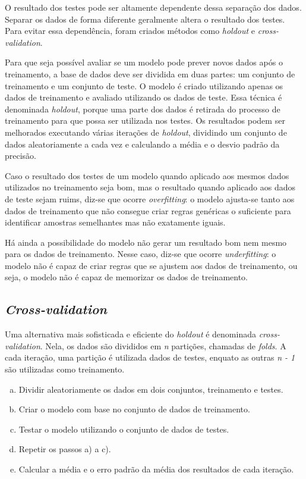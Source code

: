 O resultado dos testes pode ser altamente dependente dessa separação dos dados. Separar os dados de forma diferente geralmente altera o resultado dos testes. Para evitar essa dependência, foram criados métodos como \emph{holdout} e \emph{cross-validation}.

Para que seja possível avaliar se um modelo pode prever novos dados após o treinamento, a base de dados deve ser dividida em duas partes: um conjunto de treinamento e um conjunto de teste. O modelo é criado utilizando apenas os dados de treinamento e avaliado utilizando os dados de teste. Essa técnica é denominada \emph{holdout}, porque uma parte dos dados é retirada do processo de treinamento para que possa ser utilizada nos testes. Os resultados podem ser melhorados executando várias iterações de \emph{holdout}, dividindo um conjunto de dados aleatoriamente a cada vez e calculando a média e o desvio padrão da precisão.

Caso o resultado dos testes de um modelo quando aplicado aos mesmos dados utilizados no treinamento seja bom, mas o resultado quando aplicado aos dados de teste sejam ruims, diz-se que ocorre \emph{overfitting}: o modelo ajusta-se tanto aos dados de treinamento que não consegue criar regras genéricas o suficiente para identificar amostras semelhantes mas não exatamente iguais.

Há ainda a possibilidade do modelo não gerar um resultado bom nem mesmo para os dados de treinamento. Nesse caso, diz-se que ocorre \emph{underfitting}: o modelo não é capaz de criar regras que se ajustem aos dados de treinamento, ou seja, o modelo não é capaz de memorizar os dados de treinamento.

\subsection{\emph{Cross-validation}}
\label{sec:eval_cross_validation}

Uma alternativa mais sofisticada e eficiente do \emph{holdout} é denominada \emph{cross-validation}. Nela, os dados são divididos em \emph{n} partições, chamadas de \emph{folds}. A cada iteração, uma partição é utilizada dados de testes, enquato as outras \emph{n - 1} são utilizadas como treinamento.

\begin{enumerate}[a)]
    \item Dividir aleatoriamente os dados em dois conjuntos, treinamento e testes.
    \item Criar o modelo com base no conjunto de dados de treinamento.
    \item Testar o modelo utilizando o conjunto de dados de testes.
    \item Repetir os passos a) a c).
    \item Calcular a média e o erro padrão da média dos resultados de cada iteração.
\end{enumerate}

